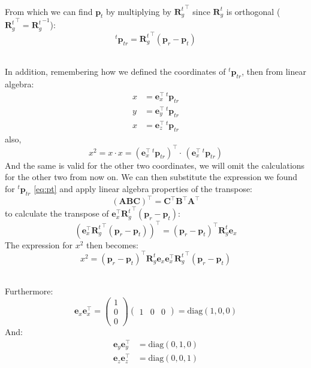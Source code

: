 \documentclass[main]{subfiles}
\begin{document}
\noindent\\
From which we can find $\mathbf{p}_t$ by multiplying by ${\mathbf{R}_g^t}^\top$ since ${\mathbf{R}_g^t}$ is orthogonal (${\mathbf{R}_g^t}^\top = {\mathbf{R}_g^t}^{-1}$):
\begin{equation}
    {}^t \mathbf{p}_{tr} = {\mathbf{R}_g^t}^\top (\mathbf{p}_r - \mathbf{p}_t)
    \label{eq:pt}
\end{equation}

\noindent\\
In addition, remembering how we defined the coordinates of ${}^t \mathbf{p}_{tr}$, then from linear algebra:
\[
\begin{aligned}
x &= \mathbf{e}_x^\top \, {}^t \mathbf{p}_{tr} \\
y &= \mathbf{e}_y^\top \, {}^t \mathbf{p}_{tr} \\
x  &= \mathbf{e}_z^\top  \, {}^t \mathbf{p}_{tr}
\end{aligned}
\]
also,
\[
x^2 = x \cdot x = \left( \mathbf{e}_x^\top \, {}^t \mathbf{p}_{tr} \right)^\top \cdot \, \left( \mathbf{e}_x^\top \, {}^t \mathbf{p}_{tr} \right)
\]
And the same is valid for the other two coordinates, we will omit the calculations for the other two from now on. 
We can then substitute the expression we found for ${}^t \mathbf{p}_{tr}$ \eqref{eq:pt} and apply linear algebra properties of the transpose:
$$(\mathbf{A}\mathbf{B}\mathbf{C})^\top = \mathbf{C}^\top \mathbf{B}^\top \mathbf{A}^\top$$ to calculate the transpose of $\mathbf{e}_x^\top {\mathbf{R}_g^t}^\top (\mathbf{p}_r - \mathbf{p}_t)$:
\[
(\mathbf{e}_x^\top {\mathbf{R}_g^t}^\top (\mathbf{p}_r - \mathbf{p}_t))^\top = (\mathbf{p}_r - \mathbf{p}_t)^\top {\mathbf{R}_g^t} \mathbf{e}_x
\]
The expression for $x^2$ then becomes:
\begin{equation}
    x^2 = \left(\mathbf{p}_r - \mathbf{p}_t\right)^\top {\mathbf{R}_g^t} \mathbf{e}_x \mathbf{e}_x^\top {\mathbf{R}_g^t}^\top \left(\mathbf{p}_r - \mathbf{p}_t\right)
    \label{eq:x2}
\end{equation}

\noindent\\
Furthermore:
\[
\mathbf{e}_x \mathbf{e}_x^\top =\begin{pmatrix}
1 \\
0 \\
0
\end{pmatrix}
\begin{pmatrix}
1 & 0 & 0
\end{pmatrix}
 = \text{diag}(1,0,0)
\]
And:
\[
\begin{aligned}
    \mathbf{e}_y \mathbf{e}_y^\top &= \text{diag}(0,1,0) \\
    \mathbf{e}_z \mathbf{e}_z^\top &= \text{diag}(0,0,1)
\end{aligned}
\]
\end{document}
